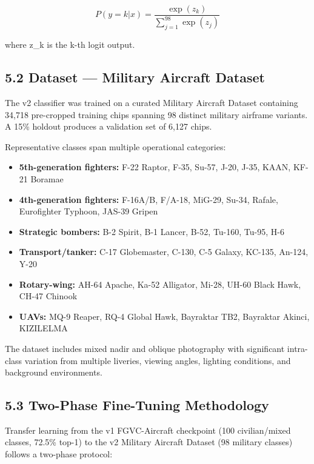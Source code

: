 \documentclass[11pt,a4paper]{article}
\providecommand{\tightlist}{\setlength{\itemsep}{0pt}\setlength{\parskip}{0pt}}
\begin{document}
\[P(y = k | x) = \frac{\exp(z_k)}{\sum_{j=1}^{98} \exp(z_j)} \tag{5}\]

where z\_k is the k-th logit output.

\hypertarget{dataset-military-aircraft-dataset}{%
\subsection{5.2 Dataset --- Military Aircraft Dataset}\label{dataset-military-aircraft-dataset}}

The v2 classifier was trained on a curated Military Aircraft Dataset containing 34,718 pre-cropped training chips spanning 98 distinct military airframe variants. A 15\% holdout produces a validation set of 6,127 chips.

Representative classes span multiple operational categories:

\begin{itemize}
\tightlist
\item
  \textbf{5th-generation fighters:} F-22 Raptor, F-35, Su-57, J-20, J-35, KAAN, KF-21 Boramae
\item
  \textbf{4th-generation fighters:} F-16A/B, F/A-18, MiG-29, Su-34, Rafale, Eurofighter Typhoon, JAS-39 Gripen
\item
  \textbf{Strategic bombers:} B-2 Spirit, B-1 Lancer, B-52, Tu-160, Tu-95, H-6
\item
  \textbf{Transport/tanker:} C-17 Globemaster, C-130, C-5 Galaxy, KC-135, An-124, Y-20
\item
  \textbf{Rotary-wing:} AH-64 Apache, Ka-52 Alligator, Mi-28, UH-60 Black Hawk, CH-47 Chinook
\item
  \textbf{UAVs:} MQ-9 Reaper, RQ-4 Global Hawk, Bayraktar TB2, Bayraktar Akinci, KIZILELMA
\end{itemize}

The dataset includes mixed nadir and oblique photography with significant intra-class variation from multiple liveries, viewing angles, lighting conditions, and background environments.

\hypertarget{two-phase-fine-tuning-methodology}{%
\subsection{5.3 Two-Phase Fine-Tuning Methodology}\label{two-phase-fine-tuning-methodology}}

Transfer learning from the v1 FGVC-Aircraft checkpoint (100 civilian/mixed classes, 72.5\% top-1) to the v2 Military Aircraft Dataset (98 military classes) follows a two-phase protocol:
\end{document}

